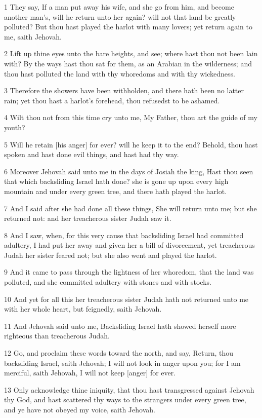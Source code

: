\par 1 They say, If a man put away his wife, and she go from him, and become another man's, will he return unto her again? will not that land be greatly polluted? But thou hast played the harlot with many lovers; yet return again to me, saith Jehovah.
\par 2 Lift up thine eyes unto the bare heights, and see; where hast thou not been lain with? By the ways hast thou sat for them, as an Arabian in the wilderness; and thou hast polluted the land with thy whoredoms and with thy wickedness.
\par 3 Therefore the showers have been withholden, and there hath been no latter rain; yet thou hast a harlot's forehead, thou refusedst to be ashamed.
\par 4 Wilt thou not from this time cry unto me, My Father, thou art the guide of my youth?
\par 5 Will he retain [his anger] for ever? will he keep it to the end? Behold, thou hast spoken and hast done evil things, and hast had thy way.
\par 6 Moreover Jehovah said unto me in the days of Josiah the king, Hast thou seen that which backsliding Israel hath done? she is gone up upon every high mountain and under every green tree, and there hath played the harlot.
\par 7 And I said after she had done all these things, She will return unto me; but she returned not: and her treacherous sister Judah saw it.
\par 8 And I saw, when, for this very cause that backsliding Israel had committed adultery, I had put her away and given her a bill of divorcement, yet treacherous Judah her sister feared not; but she also went and played the harlot.
\par 9 And it came to pass through the lightness of her whoredom, that the land was polluted, and she committed adultery with stones and with stocks.
\par 10 And yet for all this her treacherous sister Judah hath not returned unto me with her whole heart, but feignedly, saith Jehovah.
\par 11 And Jehovah said unto me, Backsliding Israel hath showed herself more righteous than treacherous Judah.
\par 12 Go, and proclaim these words toward the north, and say, Return, thou backsliding Israel, saith Jehovah; I will not look in anger upon you; for I am merciful, saith Jehovah, I will not keep [anger] for ever.
\par 13 Only acknowledge thine iniquity, that thou hast transgressed against Jehovah thy God, and hast scattered thy ways to the strangers under every green tree, and ye have not obeyed my voice, saith Jehovah.
